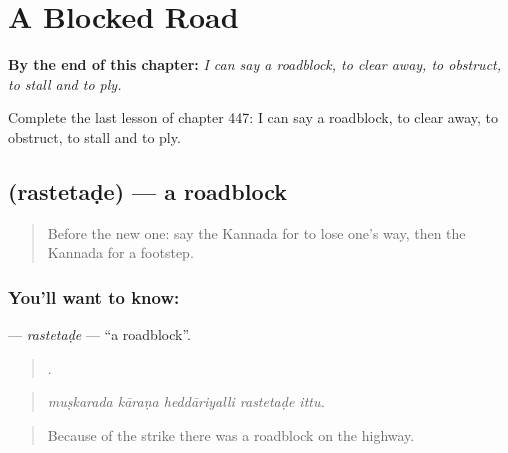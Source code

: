 
\chapter{A Blocked Road}
\label{ch:ka-a-blocked-road}

\begin{chapteropening}
\textbf{By the end of this chapter:} \emph{I can say a roadblock, to clear away, to obstruct, to stall and to ply.}

Complete the last lesson of chapter 447: I can say a roadblock, to clear away, to obstruct, to stall and to ply.
\end{chapteropening}

\section[\texorpdfstring{\kn{ರಸ್ತೆತಡೆ} (rastetaḍe)}{ರಸ್ತೆತಡೆ (rastetaḍe)}]{ (rastetaḍe) — a roadblock}

\label{lesson:KA-C447-rastetade}



\begin{quote}
Before the new one: say the Kannada for to lose one's way, then the Kannada for a footstep.
\end{quote}

\subsection*{You'll want to know: }
\textbf{} — \emph{rastetaḍe} — \textquotedblleft{}a roadblock\textquotedblright{}.

\begin{quote}
    .
\end{quote}

\begin{quote}
\emph{muṣkarada kāraṇa heddāriyalli rastetaḍe ittu.}
\end{quote}

\begin{quote}
Because of the strike there was a roadblock on the highway.
\end{quote}

